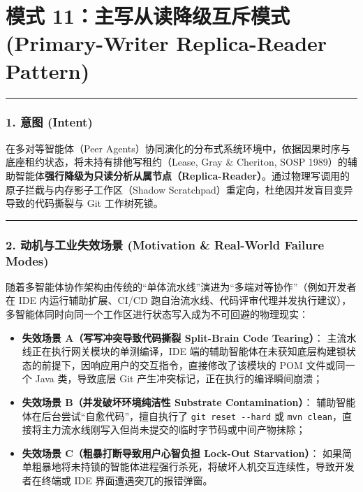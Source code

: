 \section{模式 11：主写从读降级互斥模式 (Primary-Writer Replica-Reader
Pattern)}\label{ux6a21ux5f0f-11ux4e3bux5199ux4eceux8bfbux964dux7ea7ux4e92ux65a5ux6a21ux5f0f-primary-writer-replica-reader-pattern}

\begin{center}\rule{0.5\linewidth}{0.5pt}\end{center}

\subsubsection{1. 意图 (Intent)}\label{ux610fux56fe-intent-10}

在多对等智能体（Peer
Agents）协同演化的分布式系统环境中，依据因果时序与底座租约状态，将未持有排他写租约（Lease,
Gray \& Cheriton, SOSP
1989）的辅助智能体\textbf{强行降级为只读分析从属节点（Replica-Reader）}。通过物理写调用的原子拦截与内存影子工作区（Shadow
Scratchpad）重定向，杜绝因并发盲目变异导致的代码撕裂与 Git 工作树死锁。

\begin{center}\rule{0.5\linewidth}{0.5pt}\end{center}

\subsubsection{2. 动机与工业失效场景 (Motivation \& Real-World Failure
Modes)}\label{ux52a8ux673aux4e0eux5de5ux4e1aux5931ux6548ux573aux666f-motivation-real-world-failure-modes-10}

随着多智能体协作架构由传统的``单体流水线''演进为``多端对等协作''（例如开发者在
IDE 内运行辅助扩展、CI/CD
跑自治流水线、代码评审代理并发执行建议），多智能体同时向同一个工作区进行状态写入成为不可回避的物理现实：

\begin{itemize}
\tightlist
\item
  \textbf{失效场景 A（写写冲突导致代码撕裂 Split-Brain Code Tearing）}：
  主流水线正在执行网关模块的单测编译，IDE
  端的辅助智能体在未获知底层构建锁状态的前提下，因响应用户的交互指令，直接修改了该模块的
  POM 文件或同一个 Java 类，导致底层 Git
  产生冲突标记，正在执行的编译瞬间崩溃；
\item
  \textbf{失效场景 B（并发破坏环境纯洁性 Substrate Contamination）}：
  辅助智能体在后台尝试``自愈代码''，擅自执行了
  \texttt{git\ reset\ -\/-hard} 或
  \texttt{mvn\ clean}，直接将主力流水线刚写入但尚未提交的临时字节码或中间产物抹除；
\item
  \textbf{失效场景 C（粗暴打断导致用户心智负担 Lock-Out Starvation）}：
  如果简单粗暴地将未持锁的智能体进程强行杀死，将破坏人机交互连续性，导致开发者在终端或
  IDE 界面遭遇突兀的报错弹窗。
\end{itemize}

